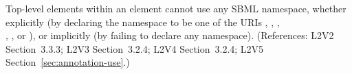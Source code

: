 Top-level elements within an  element cannot use any SBML
namespace, whether explicitly (by declaring the namespace to be one of the
URIs ,
, 
,\\
, 
, or
), or implicitly (by failing
to declare any namespace).  (References: L2V2 Section~3.3.3; L2V3
Section~3.2.4; L2V4 Section~3.2.4; L2V5 Section~\ref{sec:annotation-use}.)


